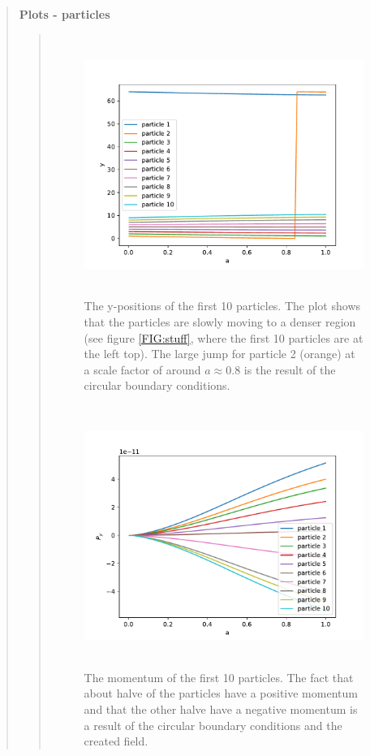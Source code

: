 \begin{quote}
\textbf{Plots - particles}
\begin{quote}
\begin{figure}[!ht]
\centering
\includegraphics[width=14cm, height=8.5cm]{./Plots/4c_pos.pdf}
\caption{The y-positions of the first 10 particles. The plot shows that the particles are slowly moving to a denser region (see figure \ref{FIG:stuff}, where the first 10 particles are at the left top). The large jump for particle 2 (orange) at a scale factor of around $ a \approx 0.8$ is the result of the circular boundary conditions.  }
\end{figure}
\begin{figure}[!ht]
\centering
\includegraphics[width=14cm, height=8.5cm]{./Plots/4c_momentum.pdf}
\caption{The momentum of the first 10 particles. The fact that about halve of the particles have a positive momentum and that the other halve have a negative momentum is a result of the circular boundary conditions and the created field.  }
\end{figure}
\end{quote}
\newpage


\end{quote}




